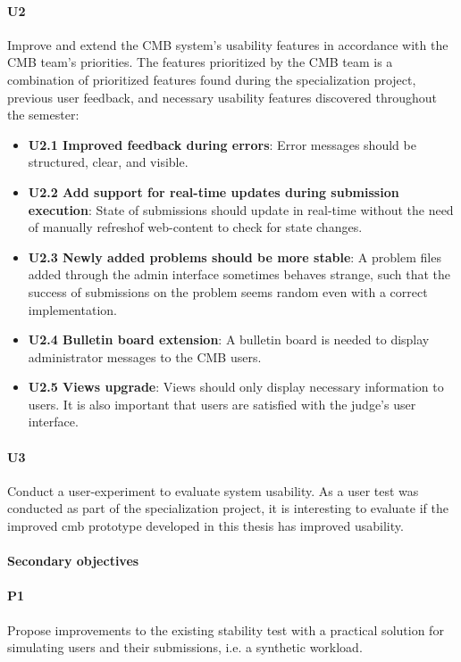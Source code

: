 \paragraph*{U2} Improve and extend the CMB system's usability features in accordance with the CMB team's priorities. The features prioritized by the CMB team is a combination of prioritized features found during the specialization project, previous user feedback, and necessary usability features discovered throughout the semester:
  \begin{itemize}
    \item \textbf{U2.1 Improved feedback during errors}: Error messages should be structured, clear, and visible.
    \item \textbf{U2.2 Add support for real-time updates during submission execution}: State of submissions should update in real-time without the need of manually refreshof web-content to check for state changes.
    \item \textbf{U2.3 Newly added problems should be more stable}: A problem files added through the admin interface sometimes behaves strange, such that the success of submissions on the problem seems random even with a correct implementation.
    \item \textbf{U2.4 Bulletin board extension}: A bulletin board is needed to display administrator messages to the CMB users.
    \item \textbf{U2.5 Views upgrade}: Views should only display necessary information to users. It is also important that users are satisfied with the judge's user interface.
  \end{itemize}

\paragraph*{U3} Conduct a user-experiment to evaluate system usability. As a user test was conducted as part of the specialization project, it is interesting to evaluate if the improved \gls{cmb} prototype developed in this thesis has improved usability.

\paragraph*{Secondary objectives} \hfill

\paragraph*{P1} Propose improvements to the existing stability test with a practical solution for simulating users and their submissions, i.e. a synthetic workload.

